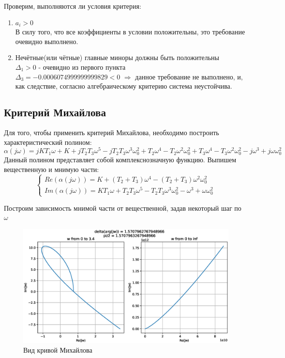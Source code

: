 \documentclass[12pt]{article}
\begin{document}
\pagebreak
Проверим, выполняются ли условия критерия:
\begin{enumerate}
 \item $a_i > 0$ \\
 В силу того, что все коэффициенты в условии положительны, это требование очевидно выполнено.
 \item Нечётные(или чётные) главные миноры должны быть положительны \\ 
 $\Delta_1 > 0$ - очевидно из первого пункта \\
 $\Delta_3 = -0.0006074999999999829 < 0$ $\Rightarrow$ данное требование не выполнено, и, как следствие, согласно алгебраическому критерию система неустойчива.
 
\end{enumerate}


\subsection{Критерий Михайлова}

Для того, чтобы применить критерий Михайлова, необходимо построить характеристический полином:
\begin{equation}
 \alpha(j\omega) = jKT_1\omega + K + jT_2T_3\omega^5 - jT_2T_3\omega^3\omega_0^2 + T_2\omega^4 - 
 T_2\omega^2\omega_0^2 + T_3\omega^4 - T_3\omega^2\omega_0^2 - j\omega^3 + j\omega\omega_0^2
\end{equation}
Данный полином представляет собой комплекснозначную функцию. Выпишем вещественную и мнимую части:
\begin{equation}
 \begin{cases}
  Re(\alpha(j\omega)) = K + (T_2 + T_3)\omega^4 - (T_2 + T_3)\omega^2\omega_0^2 \\
  Im(\alpha(j\omega)) = KT_1\omega + T_2T_3\omega^5 -T_2T_3\omega^3\omega_0^2 - \omega^3 + \omega\omega_0^2
 \end{cases}
\end{equation}

Построим зависимость мнимой части от вещественной, задав некоторый шаг по $\omega$

\begin{figure}[H]
\centerline{\includegraphics[scale = 0.6]{Figure_1.eps}}
\caption{Вид кривой Михайлова}
\end{figure}
\end{document}
